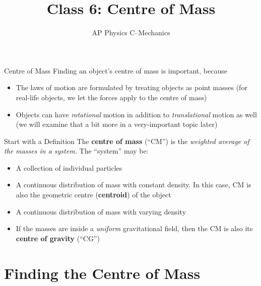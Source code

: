 \documentclass[12pt,compress,aspectratio=169]{beamer}
\title{Class 6: Centre of Mass}
\subtitle{AP Physics C--Mechanics}
\begin{document}
\begin{frame}
  \maketitle
\end{frame}



\begin{frame}{Centre of Mass}
  Finding an object's centre of mass is important, because
  \begin{itemize}
  \item The laws of motion are formulated by treating objects as point masses
    (for real-life objects, we let the forces apply to the centre of mass)
  \item Objects can have \emph{rotational} motion in addition to
    \emph{translational} motion as well (we will examine that a bit more in a
    very-important topic later)
  \end{itemize}
\end{frame}



\begin{frame}{Start with a Definition}
  The \textbf{centre of mass} (``CM'') is the \emph{weighted average of the
  masses in a system.} The ``system'' may be:
  \begin{itemize}
  \item A collection of individual particles
  \item A continuous distribution of mass with constant density. In this case,
    CM is also the geometric centre (\textbf{centroid}) of the object
  \item A continuous distribution of mass with varying density
  \item If the masses are inside a \emph{uniform} gravitational field, then the
    CM is also its \textbf{centre of gravity} (``CG'')
  \end{itemize}
\end{frame}


\section{Finding the Centre of Mass}
\end{document}
